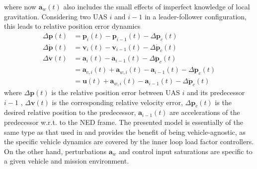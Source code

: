 \documentclass{ifacconf}
\providecommand{\mbf}[1]{\mathbf{#1}}
\newcommand{\idxFollower}{{\ensuremath{i} }}
\newcommand{\idxPredecessor}{{\ensuremath{i-1} }}
\begin{document}
where now $\mbf{a}_w(t)$ also includes the small effects of imperfect knowledge of local gravitation. 
Considering two UAS \idxFollower  and \idxPredecessor in a leader-follower configuration, this leads to relative position error dynamics
\begin{align}
\Delta \mbf{p}(t) &= \mbf{p}_\idxFollower(t) - \mbf{p}_\idxPredecessor(t) - \Delta \mbf{p}_c(t) \\
\Delta \dot{\mbf{p}}(t) &= \mbf{v}_{\idxFollower}(t) - \mbf{v}_{\idxPredecessor}(t) -  \Delta \dot{\mbf{p}}_c(t) \\
\Delta \dot{\mbf{v}}(t) &= \mbf{a}_\idxFollower(t) - \mbf{a}_\idxPredecessor(t) -  \Delta \ddot{\mbf{p}}_c(t)\\
{} &= \mbf{a}_{c,\idxFollower}(t) + \mbf{a}_{w,\idxFollower}(t)
 - \mbf{a}_\idxPredecessor(t) -  \Delta \ddot{\mbf{p}}_c(t)\\
{} &= \mbf{u}(t) + \mbf{a}_{w,\idxFollower}(t)
 - \mbf{a}_\idxPredecessor(t) -  \Delta \ddot{\mbf{p}}_c(t)
\end{align}
where $\Delta \mbf{p}(t)$ is the relative position error between UAS \idxFollower and its predecessor \idxPredecessor, $\Delta \mbf{v}(t)$ is the corresponding relative velocity error, $\Delta \mbf{p}_c(t)$ is the desired relative position to the predecessor, $\mbf{a}_\idxPredecessor(t)$ are accelerations of the predecessor w.r.t. to the NED frame.
The presented model is essentially of the same type as that used in  \cite{galzi2006uav} and provides the benefit of being vehicle-agnostic, as the specific vehicle dynamics are covered by the inner loop load factor controllers. On the other hand, perturbations $\mbf{a}_w$ and control input saturations are specific to a given vehicle and mission environment. %
\end{document}
